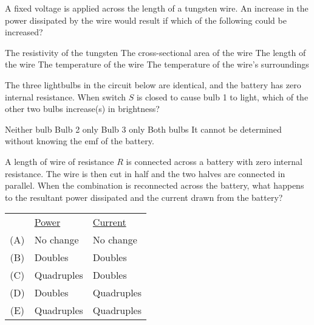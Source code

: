 \documentclass[12pt]{../../oss-classkick-exam}
\begin{document}
\begin{questions}
  \uplevel{\rule{\linewidth}{.5pt}}

  \question A fixed voltage is applied across the length of a tungsten wire. An
  increase in the power dissipated by the wire would result if which of the
  following could be increased?
  \begin{choices}
    \choice The resistivity of the tungsten
    \choice The cross-sectional area of the wire
    \choice The length of the wire
    \choice The temperature of the wire
    \choice The temperature of the wire’s surroundings
  \end{choices}
  \newpage
  
  \question The three lightbulbs in the circuit below are identical, and the
  battery has zero internal resistance. When switch $S$ is closed to cause
  bulb 1 to light, which of the other two bulbs increase(s) in brightness?

  \begin{minipage}{.3\linewidth}
  \end{minipage}
  \begin{minipage}{.64\linewidth}
    \begin{choices}
      \choice Neither bulb
      \choice Bulb 2 only
      \choice Bulb 3 only
      \choice Both bulbs
      \choice It cannot be determined without knowing the emf of the battery.
    \end{choices}
  \end{minipage}

  \uplevel{ \rule{\linewidth}{.5pt}}
  
  \question A length of wire of resistance $R$ is connected across a battery
  with zero internal resistance. The wire is then cut in half and the two
  halves are connected in parallel. When the combination is reconnected across
  the battery, what happens to the resultant power dissipated and the current
  drawn from the battery?

  \begin{tabular}{cll}
    & \underline{Power} & \underline{Current}\\
    (A) & No change  & No change \\
    (B) & Doubles    & Doubles   \\
    (C) & Quadruples & Doubles   \\
    (D) & Doubles    & Quadruples\\
    (E) & Quadruples & Quadruples
  \end{tabular}

  \uplevel{ \rule{\linewidth}{.5pt}}


\end{questions}
\end{document}
